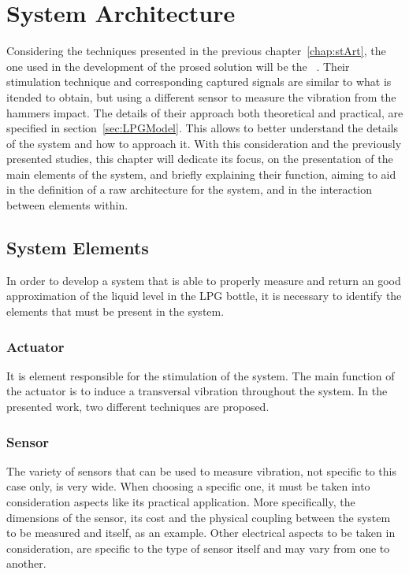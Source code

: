 \cleardoublepage
\chapter{System Architecture} \label{chap:sysArch}
Considering the techniques presented in the previous chapter~\ref{chap:stArt}, the one used in the development of the prosed solution will be the ~\citeauthor{wuAnalysisImplementationNoncontact2016a}\cite{wuAnalysisImplementationNoncontact2016a}. Their stimulation technique and corresponding captured signals are similar to what is itended to obtain, but using a different sensor to measure the vibration from the hammers impact. The details of their approach both theoretical and practical, are specified in section~\ref{sec:LPGModel}. This allows to better understand the details of the system and how to approach it. With this consideration and the previously presented studies, this chapter will dedicate its focus, on the presentation of the main elements of the system, and briefly explaining their function, aiming to aid in the definition of a raw architecture for the system, and in the interaction between elements within.

\section{System Elements}
In order to develop a system that is able to properly measure and return an good approximation of the liquid level in the LPG bottle, it is necessary to identify the elements that must be present in the system.

\subsection*{Actuator}
It is element responsible for the stimulation of the system. The main function of the actuator is to induce a transversal vibration throughout the system. In the presented work, two different techniques are proposed.
\subsection*{Sensor}
The variety of sensors that can be used to measure vibration, not specific to this case only, is very wide. When choosing a specific one, it must be taken into consideration aspects like its practical application. More specifically, the dimensions of the sensor, its cost and the physical coupling between the system to be measured and itself, as an example. Other electrical aspects to be taken in consideration, are specific to the type of sensor itself and may vary from one to another.

